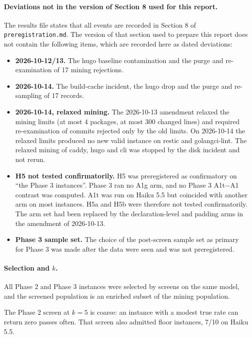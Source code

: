 \paragraph{Deviations not in the version of Section 8 used for this report.} The results file states that all events are recorded in Section 8 of \texttt{preregistration.md}. The version of that section used to prepare this report does not contain the following items, which are recorded here as dated deviations:
\begin{itemize}
\item \textbf{2026-10-12/13.} The hugo baseline contamination and the purge and re-examination of 17 mining rejections.
\item \textbf{2026-10-14.} The build-cache incident, the hugo drop and the purge and re-sampling of 17 records.
\item \textbf{2026-10-14, relaxed mining.} The 2026-10-13 amendment relaxed the mining limits (at most 4 packages, at most 300 changed lines) and required re-examination of commits rejected only by the old limits. On 2026-10-14 the relaxed limits produced no new valid instance on restic and golangci-lint. The relaxed mining of caddy, hugo and cli was stopped by the disk incident and not rerun.
\item \textbf{H5 not tested confirmatorily.} H5 was preregistered as confirmatory on ``the Phase 3 instances''. Phase 3 ran no A1g arm, and no Phase 3 A1t$-$A1 contrast was computed. A1t was run on Haiku 5.5 but coincided with another arm on most instances. H5a and H5b were therefore not tested confirmatorily. The arm set had been replaced by the declaration-level and padding arms in the amendment of 2026-10-13.
\item \textbf{Phase 3 sample set.} The choice of the post-screen sample set as primary for Phase 3 was made after the data were seen and was not preregistered.
\end{itemize}

\paragraph{Selection and $k$.} All Phase 2 and Phase 3 instances were selected by screens on the same model, and the screened population is an enriched subset of the mining population.

The Phase 2 screen at $k=5$ is coarse: an instance with a modest true rate can return zero passes often. That screen also admitted floor instances, 7/10 on Haiku 5.5.

